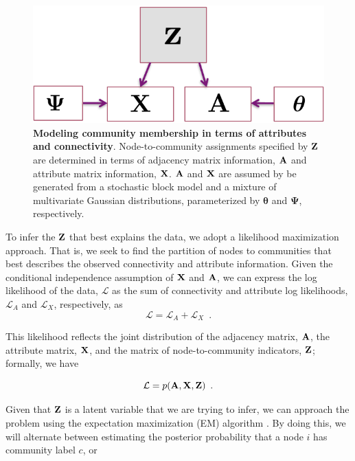 \documentclass[10pt,journal,compsoc]{IEEEtran}
\begin{document}
\begin{figure}
\begin{center}
\includegraphics[scale=0.5]{GraphModel.pdf}
\caption{{\bf Modeling community membership in terms of attributes and connectivity}. Node-to-community assignments specified by ${\bf Z}$ are determined in terms of adjacency matrix information, ${\bf A}$ and attribute matrix information, ${\bf X}$. ${\bf A}$ and ${\bf X}$ are assumed by be generated from a stochastic block model and a mixture of multivariate Gaussian distributions, parameterized by ${\boldsymbol \theta}$ and ${\boldsymbol \Psi}$, respectively.
\label{fig:graphical_model}} 
\end{center}
\end{figure}

To infer the ${\bf Z}$ that best explains the data, we adopt a likelihood maximization approach. That is, we seek to find the partition of nodes to communities that best describes the observed connectivity and attribute information.  Given the conditional independence assumption of ${\bf X}$ and ${\bf A}$, we can express the log likelihood of the data, ${\mathcal L}$ as the sum of connectivity and attribute log likelihoods, ${\mathcal L}_{A}$ and ${\mathcal L}_{X}$, respectively,
as
\begin{equation}
\mathcal{L}=\mathcal{L}_{A}+\mathcal{L}_{X}\enspace.
\label{eqn:likelihood_decomposition}
\end{equation}

This likelihood reflects the joint distribution of the adjacency matrix, ${\bf A}$, the attribute matrix, ${\bf X}$, and the matrix of node-to-community indicators, ${\bf Z}$; formally, we have 

\begin{equation}
\mathcal{L}=p({\bf A},{\bf X},{\bf Z})\enspace. 
\end{equation}

Given that ${\bf Z}$ is a latent variable that we are trying to infer, we can approach the problem using the expectation maximization (EM) algorithm \cite{EM}. By doing this, we will alternate between estimating the posterior probability that a node $i$ has community label $c$, or
\end{document}
